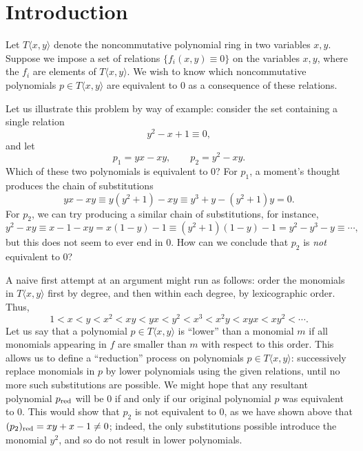 \section{Introduction}\label{sec:introduction}

Let $T\langle x,y\rangle$ denote the noncommutative polynomial ring in two variables $x,y$. Suppose we impose a set of relations $\{f_i(x,y)\equiv 0\}$ on the variables $x,y$, where the $f_i$ are elements of $T\langle x,y\rangle$. We wish to know which noncommutative polynomials $p\in T\langle x,y\rangle$ are equivalent to $0$ as a consequence of these relations.

Let us illustrate this problem by way of example: consider the set containing a single relation
\begin{equation}
\label{eqn:relations}
y^2-x+1\equiv 0,
\end{equation}
and let
\begin{equation*}
p_1=yx-xy,\qquad p_2=y^2-xy.
\end{equation*}
Which of these two polynomials is equivalent to $0$? For $p_1$, a moment's thought produces the chain of substitutions
\begin{equation}
\label{eqn:p1}
yx-xy\equiv y(y^2+1)-xy\equiv y^3+y-(y^2+1)y=0.
\end{equation}
For $p_2$, we can try producing a similar chain of substitutions, for instance,
\begin{equation*}
y^2-xy\equiv x-1-xy=x(1-y)-1\equiv(y^2+1)(1-y)-1=y^2-y^3-y\equiv\cdots,
\end{equation*}
but this does not seem to ever end in $0$. How can we conclude that $p_2$ is \emph{not} equivalent to $0$?

A naive first attempt at an argument might run as follows: order the monomials in $T\langle x,y\rangle$ first by degree, and then within each degree, by lexicographic order. Thus,
\begin{equation}\label{eq:deglex-two-variables}
1<x<y<x^2<xy<yx<y^2<x^3<x^2y<xyx<xy^2<\cdots.
\end{equation}
Let us say that a polynomial $p\in T\langle x,y\rangle$ is ``lower'' than a monomial $m$ if all monomials appearing in $f$ are smaller than $m$ with respect to this order. This allows us to define a ``reduction'' process on polynomials $p\in T\langle x,y\rangle$: successively replace monomials in $p$ by lower polynomials using the given relations, until no more such substitutions are possible. We might hope that any resultant polynomial $p_{\mathrm{red}}$ will be $0$ if and only if our original polynomial $p$ was equivalent to $0$. This would show that $p_2$ is not equivalent to $0$, as we have shown above that $(p_2)_{\mathrm{red}}=xy+x-1\ne 0$; indeed, the only substitutions possible introduce the monomial $y^2$, and so do not result in lower polynomials.

